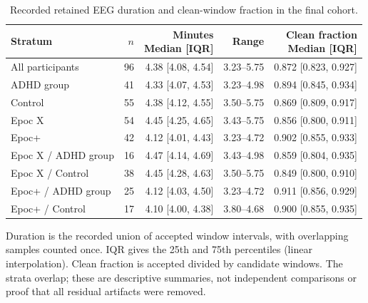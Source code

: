 \begin{table}[!htbp]
\centering\small
\caption{Recorded retained EEG duration and clean-window fraction in the final cohort.}
\label{tab:duration}
\begin{tabular}{lrrrr}
\toprule
Stratum & $n$ & \shortstack{Minutes\\Median [IQR]} & Range & \shortstack{Clean fraction\\Median [IQR]}\\
\midrule
All participants & 96 & 4.38 [4.08, 4.54] & 3.23--5.75 & 0.872 [0.823, 0.927]\\
ADHD group & 41 & 4.33 [4.07, 4.53] & 3.23--4.98 & 0.894 [0.845, 0.934]\\
Control & 55 & 4.38 [4.12, 4.55] & 3.50--5.75 & 0.869 [0.809, 0.917]\\
Epoc X & 54 & 4.45 [4.25, 4.65] & 3.43--5.75 & 0.856 [0.800, 0.911]\\
Epoc+ & 42 & 4.12 [4.01, 4.43] & 3.23--4.72 & 0.902 [0.855, 0.933]\\
Epoc X / ADHD group & 16 & 4.47 [4.14, 4.69] & 3.43--4.98 & 0.859 [0.804, 0.935]\\
Epoc X / Control & 38 & 4.45 [4.28, 4.63] & 3.50--5.75 & 0.849 [0.800, 0.910]\\
Epoc+ / ADHD group & 25 & 4.12 [4.03, 4.50] & 3.23--4.72 & 0.911 [0.856, 0.929]\\
Epoc+ / Control & 17 & 4.10 [4.00, 4.38] & 3.80--4.68 & 0.900 [0.855, 0.935]\\
\bottomrule
\end{tabular}
\par\smallskip\begin{minipage}{\textwidth}\footnotesize Duration is the recorded union of accepted window intervals, with overlapping samples counted once. IQR gives the 25th and 75th percentiles (linear interpolation). Clean fraction is accepted divided by candidate windows. The strata overlap; these are descriptive summaries, not independent comparisons or proof that all residual artifacts were removed.
\end{minipage}
\end{table}
